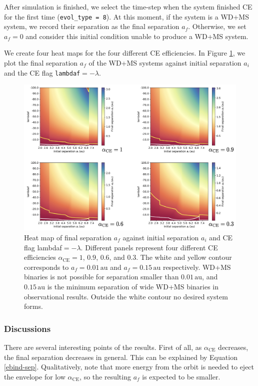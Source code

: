 \documentclass[linenumbers]{aastex631}
\newcommand{\alphace}{\alpha_{\mathrm{CE}}}
\newcommand{\au}{\, \mathrm{au}}
\begin{document}
After simulation is finished, we select the time-step when the system finished CE for the first time (\verb|evol_type = 8|). At this moment, if the system is a WD+MS system, we record their separation as the final separation $a_f$. Otherwise, we set $a_f = 0$ and consider this initial condition unable to produce a WD+MS system.

We create four heat maps for the four different CE efficiencies. In Figure \ref{res_hi}, we plot the final separation $a_f$ of the WD+MS systems against initial separation $a_i$ and the CE flag \verb|lambdaf|$= - \lambda$.

\begin{figure}
	\centering
	\includegraphics[width=0.8\linewidth]{fig/7+1results.png}
	\caption{ Heat map of final separation $a_f$ against initial separation $a_i$ and CE flag lambdaf$=-\lambda$. Different panels represent four different CE efficiencies $\alphace = 1$, $0.9$, $0.6$, and $0.3$. The white and yellow contour corresponds to $a_f = 0.01 \au$ and $a_f = 0.15 \au$ respectively. WD+MS binaries is not possible for separation smaller than $0.01 \au$, and $0.15 \au$ is the minimum separation of wide WD+MS binaries in observational results. Outside the white contour no desired system forms.}
	\label{res_hi}
\end{figure}

\subsubsection{Discussions}

There are several interesting points of the results. First of all, as $\alphace$ decreases, the final separation decreases in general. This can be explained by Equation \ref{ebind-sep}. Qualitatively, note that more energy from the orbit is needed to eject the envelope for low $\alphace$, so the resulting $a_f$ is expected to be smaller. 
\end{document}
